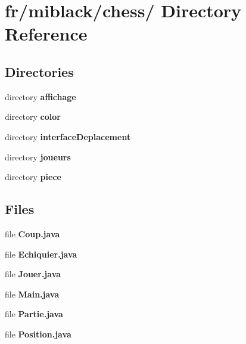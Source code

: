 \section{fr/miblack/chess/ Directory Reference}
\label{dir_566150d2b1e3e2222422eb45d6ceabfc}
\subsection*{Directories}
\begin{DoxyCompactItemize}
\item 
directory {\bf affichage}
\item 
directory {\bf color}
\item 
directory {\bf interface\-Deplacement}
\item 
directory {\bf joueurs}
\item 
directory {\bf piece}
\end{DoxyCompactItemize}
\subsection*{Files}
\begin{DoxyCompactItemize}
\item 
file {\bfseries Coup.\-java}
\item 
file {\bfseries Echiquier.\-java}
\item 
file {\bfseries Jouer.\-java}
\item 
file {\bfseries Main.\-java}
\item 
file {\bfseries Partie.\-java}
\item 
file {\bfseries Position.\-java}
\end{DoxyCompactItemize}
